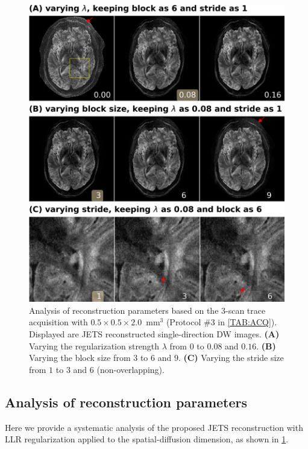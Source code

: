 \documentclass[preprint,12pt,authoryear,review]{elsarticle}
\begin{document}
    \begin{figure}
        \centering
        \includegraphics[width=\textwidth]{../figures/fig6.png}
        \caption{Analysis of reconstruction parameters based on
        the 3-scan trace acquisition with $0.5\times0.5\times2.0$~mm$^3$
        (Protocol \#3 in \cref{TAB:ACQ}).
        Displayed are JETS reconstructed single-direction DW images.
        \textbf{(A)} Varying the regularization strength $\lambda$
        from $0$ to $0.08$ and $0.16$.
        \textbf{(B)} Varying the block size from $3$ to $6$ and $9$.
        \textbf{(C)} Varying the stride size from $1$ to $3$ and
        $6$ (non-overlapping).}
        \label{FIG:ablation}
    \end{figure}

    \subsection{Analysis of reconstruction parameters}

    Here we provide a systematic analysis of
    the proposed JETS reconstruction
    with LLR regularization applied to
    the spatial-diffusion dimension, as shown in \cref{FIG:ablation}.
\end{document}
